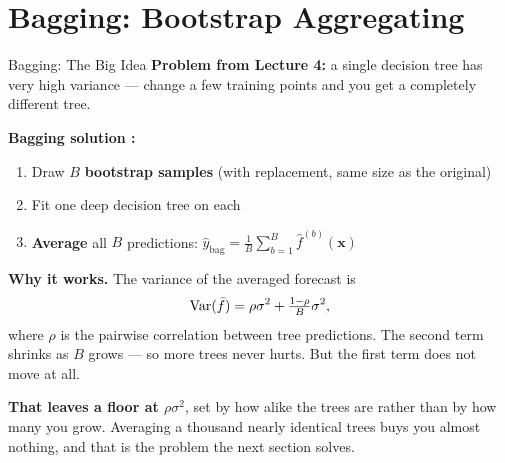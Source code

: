\documentclass[aspectratio=169, 11pt]{beamer}
\begin{document}
\section{Bagging: Bootstrap Aggregating}


\begin{frame}{Bagging: The Big Idea}
  \textbf{Problem from Lecture 4:} a single decision tree has very high variance --- change a
  few training points and you get a completely different tree.

  \textbf{Bagging solution \parencite{Breiman1996}:}
  \begin{enumerate}\small\itemsep0pt
    \item Draw $B$ \textbf{bootstrap samples} (with replacement, same size as the original)
    \item Fit one deep decision tree on each
    \item \textbf{Average} all $B$ predictions:
          $\hat{y}_{\text{bag}} = \tfrac{1}{B}\sum_{b=1}^{B} \hat{f}^{(b)}(\mathbf{x})$
  \end{enumerate}

  \vspace{0.1cm}
  \textbf{Why it works.} The variance of the averaged forecast is
  \[
    \operatorname{Var}(\bar{f}) = \rho\sigma^2 + \tfrac{1-\rho}{B}\sigma^2,
  \]
  where $\rho$ is the pairwise correlation between tree predictions. The second term shrinks
  as $B$ grows --- so more trees never hurts. But the first term does not move at all.

  \vspace{0.1cm}
  \textbf{That leaves a floor at $\rho\sigma^2$}, set by how alike the trees are rather than
  by how many you grow. Averaging a thousand nearly identical trees buys you almost nothing,
  and that is the problem the next section solves.
\end{frame}
\end{document}
